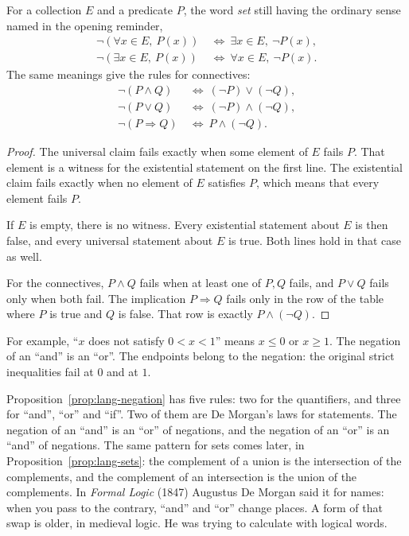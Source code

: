 \begin{proposition}\label{prop:lang-negation}
For a collection $E$ and a predicate $P$, the word \emph{set} still having the ordinary sense named in the opening reminder,
\begin{align*}
\neg(\forall x\in E,\ P(x))&\ \Longleftrightarrow\ \exists x\in E,\ \neg P(x),\\
\neg(\exists x\in E,\ P(x))&\ \Longleftrightarrow\ \forall x\in E,\ \neg P(x).
\end{align*}
The same meanings give the rules for connectives:
\begin{align*}
\neg(P\land Q)&\ \Longleftrightarrow\ (\neg P)\lor(\neg Q),\\
\neg(P\lor Q)&\ \Longleftrightarrow\ (\neg P)\land(\neg Q),\\
\neg(P\Rightarrow Q)&\ \Longleftrightarrow\ P\land(\neg Q).
\end{align*}
\end{proposition}
\begin{proof}
The universal claim fails exactly when some element of $E$ fails $P$. That element is a witness for the existential statement on the first line. The existential claim fails exactly when no element of $E$ satisfies $P$, which means that every element fails $P$.

If $E$ is empty, there is no witness. Every existential statement about $E$ is then false, and every universal statement about $E$ is true. Both lines hold in that case as well.

For the connectives, $P\land Q$ fails when at least one of $P,Q$ fails, and $P\lor Q$ fails only when both fail. The implication $P\Rightarrow Q$ fails only in the row of the table where $P$ is true and $Q$ is false. That row is exactly $P\land(\neg Q)$.
\end{proof}

For example, ``$x$ does not satisfy $0<x<1$'' means $x\le 0$ or $x\ge 1$. The negation of an ``and'' is an ``or''. The endpoints belong to the negation: the original strict inequalities fail at $0$ and at $1$.

Proposition~\ref{prop:lang-negation} has five rules: two for the quantifiers, and three for ``and'', ``or'' and ``if''. Two of them are De Morgan's laws for statements. The negation of an ``and'' is an ``or'' of negations, and the negation of an ``or'' is an ``and'' of negations. The same pattern for sets comes later, in Proposition~\ref{prop:lang-sets}: the complement of a union is the intersection of the complements, and the complement of an intersection is the union of the complements. In \emph{Formal Logic} (1847) Augustus De Morgan said it for names: when you pass to the contrary, ``and'' and ``or'' change places. A form of that swap is older, in medieval logic. He was trying to calculate with logical words.

